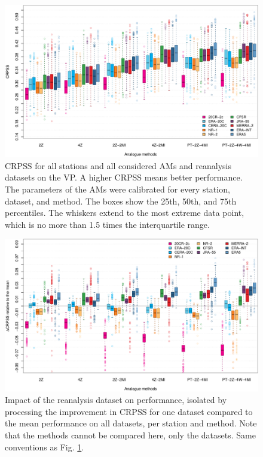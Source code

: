\documentclass[alpha-refs]{wiley-article}
\begin{document}
\begin{figure}[bt]
	\centering
	\includegraphics[width=\textwidth]{figure-6.pdf}
	\caption{CRPSS for all stations and all considered AMs and reanalysis datasets on the VP. A higher CRPSS means better performance. The parameters of the AMs were calibrated for every station, dataset, and method. The boxes show the 25th, 50th, and 75th percentiles. The whiskers extend to the most extreme data point, which is no more than 1.5 times the interquartile range.}
	\label{fig:comparison_values}
\end{figure}

\begin{figure}[bt]
	\centering
	\includegraphics[width=\textwidth]{figure-7.pdf}
	\caption{Impact of the reanalysis dataset on performance, isolated by processing the improvement in CRPSS for one dataset compared to the mean performance on all datasets, per station and method. Note that the methods cannot be compared here, only the datasets. Same conventions as Fig. \protect\ref{fig:comparison_values}.}
	\label{fig:comparison_relative}
\end{figure}
\end{document}

